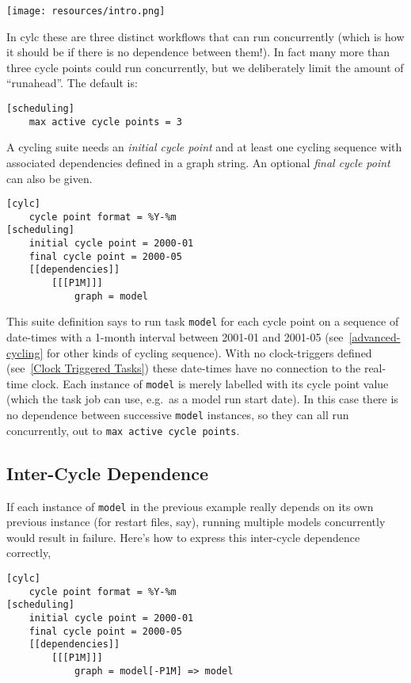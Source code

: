 \begin{center}
\texttt{[image: resources/intro.png]} %
\end{center}

In cylc these are three distinct workflows that can run concurrently (which is
how it should be if there is no dependence between them!). In fact many more
than three cycle points could run concurrently, but we deliberately limit the
amount of ``runahead''. The default is:
\begin{lstlisting}
[scheduling]
    max active cycle points = 3
\end{lstlisting}

A cycling suite needs an {\em initial cycle point} and at least one cycling
sequence with associated dependencies defined in a graph string. An optional
{\em final cycle point} can also be given.

\begin{lstlisting}[language=suiterc]
[cylc]
    cycle point format = %Y-%m
[scheduling]
    initial cycle point = 2000-01
    final cycle point = 2000-05
    [[dependencies]]
        [[[P1M]]]
            graph = model
\end{lstlisting}
This suite definition says to run task \lstinline=model= for each cycle point
on a sequence of date-times with a 1-month interval between 2001-01 and 2001-05 
(see~\ref{advanced-cycling} for other kinds of cycling sequence).
With no clock-triggers defined (see~\ref{Clock Triggered Tasks}) these
date-times have no connection to the real-time clock.  Each instance of
\lstinline=model= is merely labelled with its cycle point value (which the task
job can use, e.g.\ as a model run start date).  In this case
there is no dependence between successive \lstinline=model= instances, so they
can all run concurrently, out to \lstinline=max active cycle points=.

\subsection{Inter-Cycle Dependence}

If each instance of \lstinline=model= in the previous example really depends
on its own previous instance (for restart files, say), running multiple
models concurrently would result in failure.  Here's how to express this
inter-cycle dependence correctly,

\begin{lstlisting}[language=suiterc]
[cylc]
    cycle point format = %Y-%m
[scheduling]
    initial cycle point = 2000-01
    final cycle point = 2000-05
    [[dependencies]]
        [[[P1M]]]
            graph = model[-P1M] => model
\end{lstlisting}

